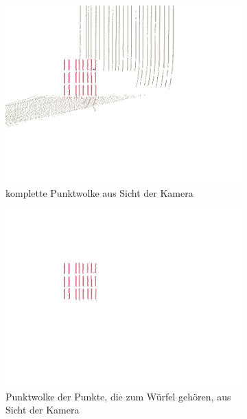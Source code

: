\documentclass[ngerman,a4paper,parskip=half]{scrartcl}
\begin{document}
\begin{figure}[H]
	\centering
	\begin{subfigure}{0.45\textwidth}
		\includegraphics[width=\textwidth]{includes/free_red_cam.png}
		\caption{komplette Punktwolke aus Sicht der Kamera}
	\end{subfigure}
	\hfill
	\begin{subfigure}{0.45\textwidth}
		\includegraphics[width=\textwidth]{includes/free_only_red_cam.png}
		\caption{Punktwolke der Punkte, die zum Würfel gehören, aus Sicht der Kamera}
	\end{subfigure}
	\begin{subfigure}{0.45\textwidth}

\end{subfigure}
\end{figure}
\end{document}
